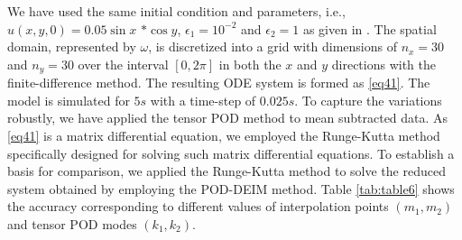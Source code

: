 \documentclass{article}
\begin{document}
 We have used the same initial condition and parameters, i.e., $u(x,y,0)=0.05\sin x$ $*\cos y$, $\epsilon_1=10^{-2}$ and $\epsilon_2=1$ as given in \cite{MatrixDEIM}. The spatial domain, represented by $\omega$, is discretized into a grid with dimensions of $n_x=30$ and $n_y=30$ over the interval  $[0,2\pi]$ in both the $x$ and $y$ directions
 with the finite-difference method. The resulting ODE system is formed as \eqref{eq41}. The model is simulated for $5s$ with a time-step of $0.025s$. To capture the variations robustly, we have applied the tensor POD method to mean subtracted data. As \eqref{eq41} is a matrix differential equation, we employed the Runge-Kutta method specifically designed for solving such matrix differential equations. To establish a basis for comparison, we applied the Runge-Kutta method to solve the reduced system obtained by employing the POD-DEIM method. Table \ref{tab:table6} shows the accuracy corresponding to different values of interpolation points $(m_1,m_2)$ and tensor POD modes $(k_1,k_2)$.
\end{document}
